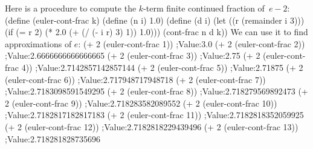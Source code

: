 Here is a procedure to compute the $k$-term finite continued fraction of~$e - 2$:
\begtt\scm 
(define (euler-cont-frac k)
  (define (n i) 1.0)
  (define (d i)
    (let ((r (remainder i 3)))
      (if (= r 2)
          (* 2.0 (+ (/ (- i r) 3) 1))
          1.0)))
  (cont-frac n d k))
\endtt
We can use it to find approximations of $e$: 
\begtt\scm
(+ 2 (euler-cont-frac 1))
;Value:3.0
(+ 2 (euler-cont-frac 2))
;Value:2.6666666666666665
(+ 2 (euler-cont-frac 3))
;Value:2.75
(+ 2 (euler-cont-frac 4))
;Value:2.7142857142857144
(+ 2 (euler-cont-frac 5))
;Value:2.71875
(+ 2 (euler-cont-frac 6))
;Value:2.717948717948718
(+ 2 (euler-cont-frac 7))
;Value:2.7183098591549295
(+ 2 (euler-cont-frac 8))
;Value:2.718279569892473
(+ 2 (euler-cont-frac 9))
;Value:2.718283582089552
(+ 2 (euler-cont-frac 10))
;Value:2.7182817182817183
(+ 2 (euler-cont-frac 11))
;Value:2.7182818352059925
(+ 2 (euler-cont-frac 12))
;Value:2.7182818229439496
(+ 2 (euler-cont-frac 13))
;Value:2.718281828735696
\endtt
